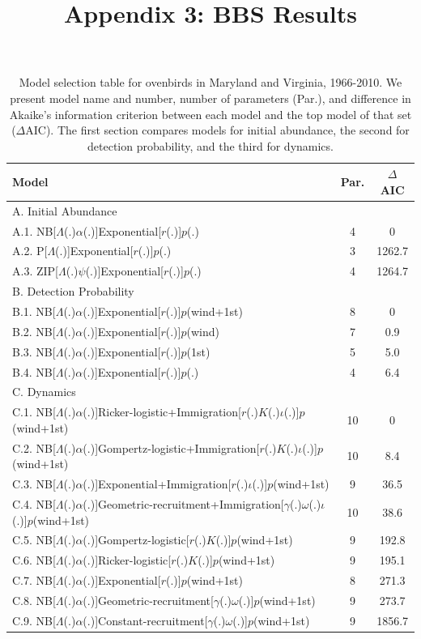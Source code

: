 \documentclass{article}
\begin{document}
\title{Appendix 3: BBS Results}
\maketitle
\renewcommand*\thetable{S3.\arabic{table}}
\renewcommand*\thefigure{S3.\arabic{figure}}
\begin{table}[htb]
  \centering
  \small
\caption{Model selection table for ovenbirds in Maryland and Virginia,
    1966-2010.  We present model name and number, number of 
parameters (Par.), and difference in Akaike's
information criterion between each model and the top model of
that set ($\Delta$AIC).  The first section compares
models for initial abundance, the second for detection
probability, and the third for dynamics.}
  \begin{tabular}[h]{lcc}
\hline
Model	&Par.	&$\Delta$AIC	\\
\hline
A. Initial Abundance && \\
A.1. NB[$\Lambda$(.)$\alpha$(.)]Exponential[$r$(.)]$p$(.)	&4	&0\\
A.2. P[$\Lambda$(.)]Exponential[$r$(.)]$p$(.)	&3	&1262.7\\
A.3. ZIP[$\Lambda$(.)$\psi$(.)]Exponential[$r$(.)]$p$(.)	&4 &1264.7\\
\hline
B. Detection Probability && \\
B.1. NB[$\Lambda$(.)$\alpha$(.)]Exponential[$r$(.)]$p$(wind+1st)	&8 &0	\\
B.2. NB[$\Lambda$(.)$\alpha$(.)]Exponential[$r$(.)]$p$(wind) &7 &0.9\\
B.3. NB[$\Lambda$(.)$\alpha$(.)]Exponential[$r$(.)]$p$(1st)	&5	&5.0
\\B.4. NB[$\Lambda$(.)$\alpha$(.)]Exponential[$r$(.)]$p$(.)	&4	&6.4\\
\hline
C. Dynamics && \\
C.1. NB[$\Lambda$(.)$\alpha$(.)]Ricker-logistic+Immigration[$r$(.)$K$(.)$\iota$(.)]$p$(wind+1st) &10	&0	\\
C.2. NB[$\Lambda$(.)$\alpha$(.)]Gompertz-logistic+Immigration[$r$(.)$K$(.)$\iota$(.)]$p$(wind+1st) &10	&8.4 \\
C.3. NB[$\Lambda$(.)$\alpha$(.)]Exponential+Immigration[$r$(.)$\iota$(.)]$p$(wind+1st) &9	&36.5\\
C.4. NB[$\Lambda$(.)$\alpha$(.)]Geometric-recruitment+Immigration[$\gamma$(.)$\omega$(.)$\iota$(.)]$p$(wind+1st) &10	&38.6\\
C.5. NB[$\Lambda$(.)$\alpha$(.)]Gompertz-logistic[$r$(.)$K$(.)]$p$(wind+1st) &9	&192.8\\
C.6. NB[$\Lambda$(.)$\alpha$(.)]Ricker-logistic[$r$(.)$K$(.)]$p$(wind+1st) &9	&195.1\\
C.7. NB[$\Lambda$(.)$\alpha$(.)]Exponential[$r$(.)]$p$(wind+1st)	&8 &271.3\\
C.8. NB[$\Lambda$(.)$\alpha$(.)]Geometric-recruitment[$\gamma$(.)$\omega$(.)]$p$(wind+1st) &9	&273.7\\
C.9. NB[$\Lambda$(.)$\alpha$(.)]Constant-recruitment[$\gamma$(.)$\omega$(.)]$p$(wind+1st) &9	&1856.7\\
\hline
\end{tabular}
\end{table}
\clearpage
\end{document}
